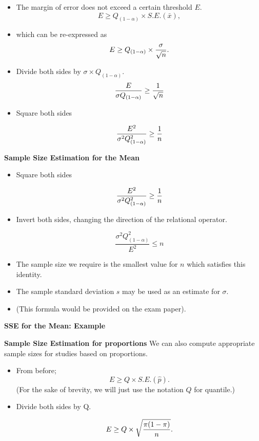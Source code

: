 \begin{itemize}

\item The margin of error does not exceed a certain threshold $E$.
\[ E \geq Q_{(1-\alpha)} \times S.E.(\bar{x}), \]

\item which can be re-expressed as
\[E \geq Q_{(1-\alpha)} \times {\sigma \over \sqrt{n} }.\]

\item Divide both sides by $\sigma \times Q_{(1-\alpha)}$.
\[ \frac{E}{\sigma Q_{(1-\alpha)}} \geq {1 \over \sqrt{n} } \]

\item Square both sides

\[ \frac{E^2}{\sigma^2 Q_{(1-\alpha)}^2} \geq {1 \over n } \]


\end{itemize}


\textbf{Sample Size Estimation for the Mean}

\begin{itemize}
\item Square both sides

\[ \frac{E^2}{\sigma^2 Q^2_{(1-\alpha)}} \geq {1 \over n } \]

\item Invert both sides, changing the direction of the relational operator.

\[ \frac{\sigma^2 Q^2_{(1-\alpha)}}{E^2} \leq n \]


\item The sample size we require is the smallest value for $n$ which satisfies this identity.
\item The sample standard deviation $s$ may be used as an estimate for $\sigma$.
\item (This formula would be provided on the exam paper).
\end{itemize}





\textbf{SSE for the Mean: Example}





\textbf{Sample Size Estimation for proportions}
We can also compute appropriate sample sizes for studies based on proportions.
\begin{itemize}
\item From before; \[ E \geq Q \times S.E.(\hat{p}). \]
(For the sake of brevity, we will just use the notation $Q$ for quantile.)

\item Divide both sides by Q.

\[ E \geq Q \times \sqrt{ {\pi(1-\pi)  \over n} }. \]

\end{itemize}


